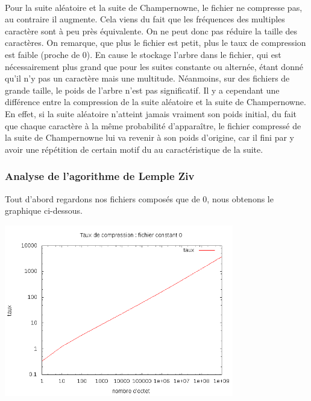 \documentclass{report}
\begin{document}
\paragraph*{}
Pour la suite aléatoire et la suite de Champernowne, le fichier ne compresse pas, au contraire il augmente. Cela viens du fait que les fréquences des multiples caractère sont à peu près équivalente. On ne peut donc pas réduire la taille des caractères. On remarque, que plus le fichier est petit, plus le taux de compression est faible (proche de 0). En cause le stockage l'arbre dans le fichier, qui est nécessairement plus grand que pour les suites constante ou alternée, étant donné qu'il n'y pas un caractère mais une multitude. Néanmoins, sur des fichiers de grande taille, le poids de l'arbre n'est pas significatif. 
Il y a cependant une différence entre la compression de la suite aléatoire et la suite de Champernowne. En effet, si la suite aléatoire n'atteint jamais vraiment son poids initial, du fait que chaque caractère à la même probabilité d'apparaître, le fichier compressé de la suite de Champernowne lui va revenir à son poids d'origine, car il fini par y avoir une répétition de certain motif du au caractéristique de la suite. \\ 

\newpage
\subsubsection{ Analyse de l'agorithme de Lemple Ziv}

Tout d'abord regardons nos fichiers composés que de 0, nous obtenons le graphique ci-dessous.
\begin{center}

\includegraphics[width=10cm]{LZConstant.png}

\end{center}
\end{document}
